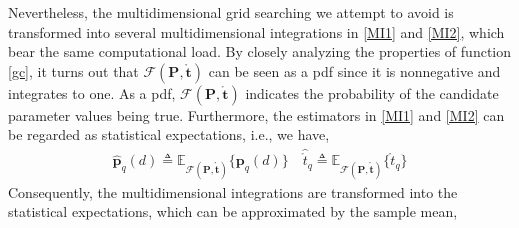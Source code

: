 \documentclass[review]{elsarticle}
\begin{document}
Nevertheless, the multidimensional grid searching we attempt to avoid is transformed into several multidimensional integrations in \eqref{MI1} and \eqref{MI2}, which bear the same computational load. By closely analyzing the properties of function \eqref{gc}, it turns out that $\mathcal{F}(\boldsymbol{P},\mathring{\boldsymbol{t}})$ can be seen as a pdf since it is nonnegative and integrates to one. As a pdf, $\mathcal{F}(\boldsymbol{P},\mathring{\boldsymbol{t}})$ indicates the probability of the candidate parameter values being true. Furthermore, the estimators in \eqref{MI1} and \eqref{MI2} can be regarded as statistical expectations, i.e., we have,
\begin{align}\label{ex}
    \hat{\boldsymbol{p}}_q(d)\triangleq \mathbb{E}_{\mathcal{F}(\boldsymbol{P},\mathring{\boldsymbol{t}})}\{\boldsymbol{p}_q(d)\} \quad \hat{\mathring{t}}_q\triangleq \mathbb{E}_{\mathcal{F}(\boldsymbol{P},\mathring{\boldsymbol{t}})}\{\mathring{t}_q\}
\end{align}
Consequently, the multidimensional integrations are transformed into the statistical expectations, which can be approximated by the sample mean,
\end{document}
